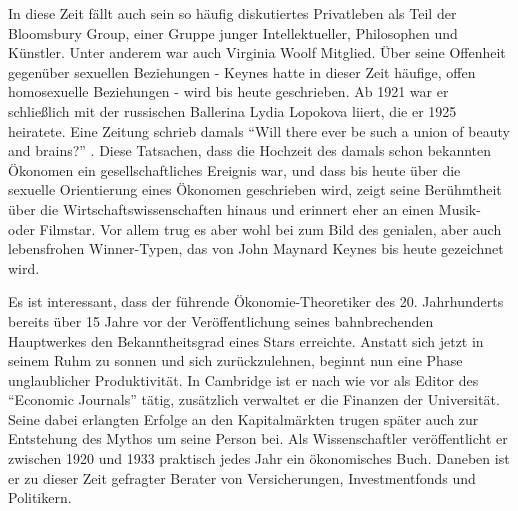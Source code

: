 In diese Zeit fällt auch sein so häufig diskutiertes Privatleben als Teil der Bloomsbury Group, einer Gruppe junger Intellektueller, Philosophen und Künstler. Unter anderem war auch Virginia Woolf Mitglied. Über seine Offenheit gegenüber sexuellen Beziehungen - Keynes hatte in dieser Zeit häufige, offen homosexuelle Beziehungen - wird bis heute geschrieben. Ab 1921 war er schließlich mit der russischen Ballerina Lydia Lopokova liiert, die er 1925 heiratete. Eine Zeitung schrieb damals "`Will there ever be such a union of beauty and brains?"' \parencite[S. 13]{Warsh}. Diese Tatsachen, dass die Hochzeit des damals schon bekannten Ökonomen ein gesellschaftliches Ereignis war, und dass bis heute über die sexuelle Orientierung eines Ökonomen geschrieben wird, zeigt seine Berühmtheit über die Wirtschaftswissenschaften hinaus und erinnert eher an einen Musik- oder Filmstar. Vor allem trug es aber wohl bei zum Bild des genialen, aber auch lebensfrohen Winner-Typen, das von John Maynard Keynes bis heute gezeichnet wird.

Es ist interessant, dass der führende Ökonomie-Theoretiker des 20. Jahrhunderts bereits über 15 Jahre vor der Veröffentlichung seines bahnbrechenden Hauptwerkes den Bekanntheitsgrad eines Stars erreichte. Anstatt sich jetzt in seinem Ruhm zu sonnen und sich zurückzulehnen, beginnt nun eine Phase unglaublicher Produktivität. In Cambridge ist er nach wie vor als Editor des "`Economic Journals"' tätig, zusätzlich verwaltet er die Finanzen der Universität. Seine dabei erlangten Erfolge an den Kapitalmärkten trugen später auch zur Entstehung des Mythos um seine Person bei. Als Wissenschaftler veröffentlicht er zwischen 1920 und 1933 praktisch jedes Jahr ein ökonomisches Buch. Daneben ist er zu dieser Zeit gefragter Berater von Versicherungen, Investmentfonds und Politikern.

